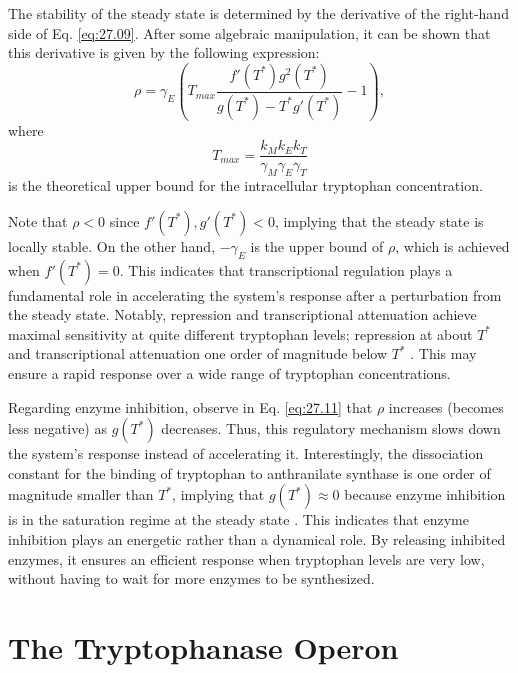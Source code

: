 The stability of the steady state is determined by the derivative of the right-hand side of Eq. \eqref{eq:27.09}. After some algebraic manipulation, it can be shown that this derivative is given by the following expression:
\begin{equation}
\rho = \gamma_E  \left( T_{max} \frac{f'(T^*) g^2(T^*)}{g(T^*)-T^* g'(T^*)} - 1\right), \label{eq:27.11}
\end{equation}
where
\begin{equation*}
T_{max}=\frac{k_M k_E k_T}{\gamma_M \gamma_E \gamma_T}
\end{equation*}
is the theoretical upper bound for the intracellular tryptophan concentration.

Note that $\rho < 0$ since $f'(T^*), g'(T^*) < 0$, implying that the steady state is locally stable. On the other hand, $-\gamma_E$ is the upper bound of $\rho$, which is achieved when $f'(T^*) = 0$. This indicates that transcriptional regulation plays a fundamental role in accelerating the system's response after a perturbation from the steady state. Notably, repression and transcriptional attenuation achieve maximal sensitivity at quite different tryptophan levels; repression at about $T^*$ and transcriptional attenuation one order of magnitude below $T^*$ \citep{Santillan2004}. This may ensure a rapid response over a wide range of tryptophan concentrations.

Regarding enzyme inhibition, observe in Eq. \eqref{eq:27.11} that $\rho$ increases (becomes less negative) as $g(T^*)$ decreases. Thus, this regulatory mechanism slows down the system's response instead of accelerating it. Interestingly, the dissociation constant for the binding of tryptophan to anthranilate synthase is one order of magnitude smaller than $T^*$, implying that $g(T^*) \approx 0$ because enzyme inhibition is in the saturation regime at the steady state \citep{Santillan2004}. This indicates that enzyme inhibition plays an energetic rather than a dynamical role. By releasing inhibited enzymes, it ensures an efficient response when tryptophan levels are very low, without having to wait for more enzymes to be synthesized.

\section{The Tryptophanase Operon}

